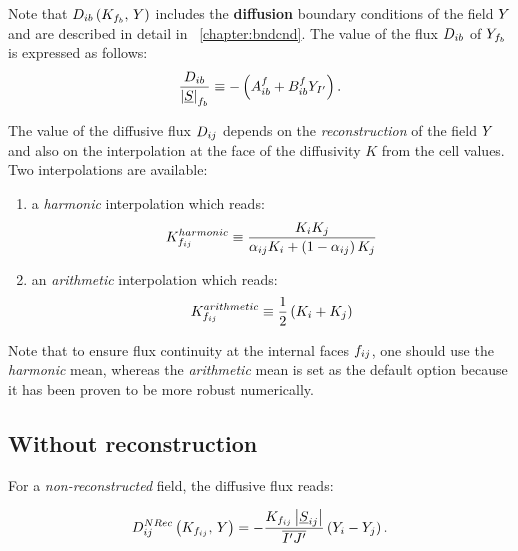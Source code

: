 Note that $D_{ib} \left( K_{f_{b}} , \, Y \right)$ includes the \textbf{diffusion} boundary conditions of the field $Y$
 and are described in detail in \chaptername~\ref{chapter:bndcnd}. The value of the flux $D_{ib} $ of $Y_{f_{b}}$ is expressed as follows:
\begin{equation}\label{eq:spadis:boundary_flux}%
\dfrac{D_\ib}{\norm{\vect{S}}_\fib}  \equiv -\left(A_\ib^f + B_\ib^f \varia_\centip\right).
\end{equation}

The value of the diffusive flux $D_{ij} $ depends on the \emph{reconstruction} of the field $Y$ and also on the interpolation at the face  of the diffusivity $K$ from the cell values. Two interpolations are available:
%
\begin{enumerate}[ label=\roman{*}/, ref=(\roman{*})]
\item a \emph{harmonic} interpolation which reads:
\begin{equation}\label{eq:spadis:harmonic_viscosity}
K_{f_{ij}}^{harmonic} \equiv  \dfrac{K_i K_j}{\alpha_{ij} K_i + \left( 1 - \alpha_{ij}\right)K_j}
\end{equation}
\item an \emph{arithmetic} interpolation which reads:
\begin{equation}
K_{f_{ij}}^{arithmetic} \equiv  \dfrac{1}{2} \left( K_i + K_j\right)
\end{equation}
\end{enumerate}
Note that to ensure flux continuity at the internal faces ${f_{ij}}$, one should use the \emph{harmonic} mean,
whereas the \emph{arithmetic} mean is set as the default option because it has been proven to be more robust numerically.

\subsection{Without reconstruction}
For a \emph{non-reconstructed} field, the diffusive flux reads:

\begin{equation}
D_{ij}^{NRec} \left( K_{f_{ij}} , \, Y \right)  =  - \dfrac{K_{f_{ij}} \left| \underline{S}_{ij} \right|}{\overline{{I^\prime} {J^\prime}} } \left( Y_i - Y_j\right).
\end{equation}


